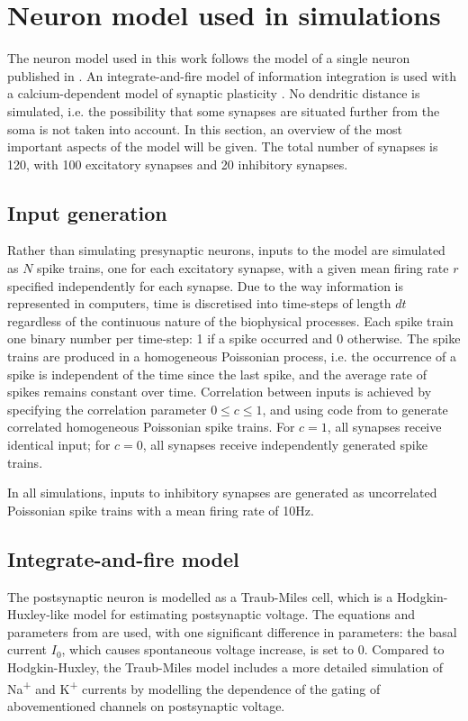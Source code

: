 \documentclass[a4paper,12pt]{report}
\theoremstyle{definition}
\begin{document}
\section{Neuron model used in simulations}

The neuron model used in this work follows the model of a single neuron published in \cite{yeung2004synaptic}. An integrate-and-fire model of information integration is used with a calcium-dependent model of synaptic plasticity \cite{shouval2002unified}. No dendritic distance is simulated, i.e. the possibility that some synapses are situated further from the soma is not taken into account. In this section, an overview of the most important aspects of the model will be given. The total number of synapses is 120, with 100 excitatory synapses and 20 inhibitory synapses.



\subsection{Input generation}
Rather than simulating presynaptic neurons, inputs to the model are simulated as $N$ spike trains, one for each excitatory synapse, with a given mean firing rate $r$ specified independently for each synapse. Due to the way information is represented in computers, time is discretised into time-steps of length $dt$ regardless of the continuous nature of the biophysical processes. Each spike train one binary number per time-step: 1 if a spike occurred and 0 otherwise. The spike trains are produced in a homogeneous Poissonian process, i.e. the occurrence of a spike is independent of the time since the last spike, and the average rate of spikes remains constant over time.
Correlation between inputs is achieved by specifying the correlation parameter $0 \leq c \leq 1$, and using code from \cite{macke2009} to generate correlated homogeneous Poissonian spike trains. For $c=1$, all synapses receive identical input; for $c=0$, all synapses receive independently generated spike trains.

In all simulations, inputs to inhibitory synapses are generated as uncorrelated Poissonian spike trains with a mean firing rate of 10Hz.




\subsection{Integrate-and-fire model}

The postsynaptic neuron is modelled as a Traub-Miles cell, which is a Hodgkin-Huxley-like model for estimating postsynaptic voltage. The equations and parameters from \cite{ermentrout1998fine} are used, with one significant difference in parameters: the basal current $I_0$, which causes spontaneous voltage increase, is set to $0$. Compared to Hodgkin-Huxley, the Traub-Miles model includes a more detailed simulation of Na\textsuperscript{+} and K\textsuperscript{+} currents by modelling the dependence of the gating of abovementioned channels on postsynaptic voltage.
\end{document}
